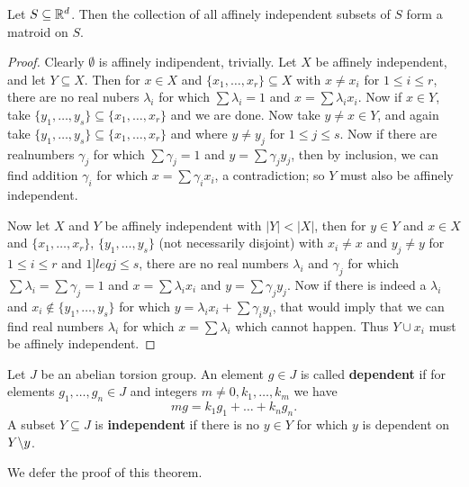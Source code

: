 \begin{theorem}\label{1.2.6}
    Let $S \subseteq \mathbb{R}^d$. Then the collection of all affinely independent subsets of  $S$ form a
    matroid on $S$.
\end{theorem}
\begin{proof}
    Clearly $\emptyset$ is affinely indipendent, trivially. Let $X$ be affinely independent, and let
     $Y \subseteq X$. Then for  $x \in X$ and  $\{x_1, \dots, x_r\} \subseteq X$ with $x \neq x_i$
     for  $1 \leq i \leq r$, there are no real nubers  $\lambda_i$ for which  $\sum{\lambda_i}=1$ and
     $x=\sum{\lambda_ix_i}$. Now if $x \in Y$, take  $\{y_1, \dots, y_s\} \subseteq \{x_1, \dots,
     x_r\}$ and we are done. Now take $y \neq x \in Y$, and again take $\{y_1, \dots, y_s\} \subseteq \{x_1, \dots,
     x_r\}$ and where $y \neq y_j$ for  $1 \leq j \leq s$. Now if there are realnumbers  $\gamma_j$
     for which  $\sum{\gamma_j}=1$ and $y=\sum{\gamma_jy_j}$, then by inclusion, we can find
     addition $\gamma_i$ for which  $x=\sum{\gamma_ix_i}$, a contradiction; so $Y$ must also be
     affinely independent.
     
     Now let  $X$ and $Y$ be affinely independent with  $|Y|<|X|$, then for  $y \in Y$ and  $x \in
     X$ and  $\{x_1, \dots, x_r\}$, $\{y_1, \dots, y_s\}$ (not necessarily disjoint) with $x_i \neq
     x$ and  $y_j \neq y$ for  $1 \leq i \leq r$ and  $1 ]leq j \leq s$, there are no real numbers
     $\lambda_i$ and  $\gamma_j$ for which  $\sum{\lambda_i}=\sum{\gamma_j}=1$ and
     $x=\sum{\lambda_ix_i}$ and $y=\sum{\gamma_jy_j}$. Now if there is indeed a $\lambda_i$ and
     $x_i \notin \{y_1, \dots, y_s\}$ for which $y=\lambda_ix_i+\sum{\gamma_iy_i}$, that would imply
     that we can find real numbers $\lambda_i$ for which  $x=\sum{\lambda_i}$ which cannot happen.
     Thus $Y \cup x_i$ must be affinely independent.
\end{proof}

\begin{definition}
    Let $J$ be an abelian torsion group. An element  $g \in J$ is called \textbf {dependent} if for
    elements $ g_1, \dots, g_n \in J$ and integers $m \neq 0, k_1, \dots, k_m$ we have 
        \begin{equation}
            mg=k_1g_1+\dots+k_ng_n.
        \end{equation}
    A subset $Y \subseteq J$ is \textbf {independent} if there is no $y \in Y$ for which  $y$ is
    dependent on  $Y\backslash y$.
\end{definition}
We defer the proof of this theorem.


